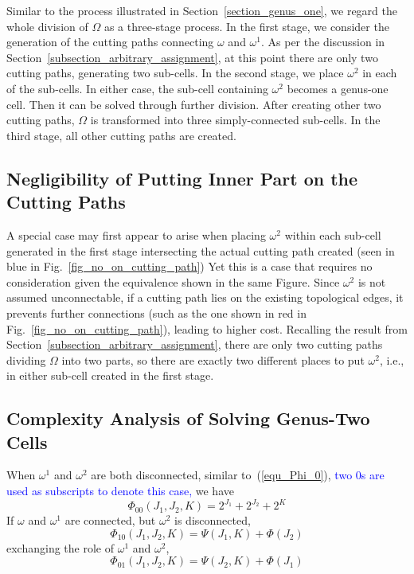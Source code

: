 \documentclass[Afour,sageh,times]{sagej}
\begin{document}
Similar to the process illustrated in Section~\ref{section_genus_one}, we regard the whole division of $\Omega$ as a three-stage process. 
In the first stage, we consider the generation of the cutting paths connecting $\omega$ and $\omega^1$. 
As per the discussion in Section~\ref{subsection_arbitrary_assignment}, at this point there are only two cutting paths, generating two sub-cells. 
In the second stage, we place $\omega^2$ in each of the sub-cells. 
In either case, the sub-cell containing $\omega^2$ becomes a genus-one cell. 
Then it can be solved through further division. 
After creating other two cutting paths, $\Omega$ is transformed into three simply-connected sub-cells. 
In the third stage, all other cutting paths are created. 

\subsection{Negligibility of Putting Inner Part on the Cutting Paths}
A special case may first appear to arise when placing $\omega^2$ within each sub-cell generated in the first stage intersecting 
the actual cutting path created (seen in blue in Fig.~\ref{fig_no_on_cutting_path}) 
Yet this is a case that requires no consideration given the equivalence shown in the same Figure. 
Since $\omega^2$ is not assumed unconnectable, if a cutting path lies on the existing topological edges, it prevents further connections
(such as the one shown in red in Fig.~\ref{fig_no_on_cutting_path}), leading to higher cost. 
Recalling the result from Section~\ref{subsection_arbitrary_assignment}, there are only two cutting paths dividing $\Omega$ into two parts, so there are exactly two different places to put $\omega^2$, i.e., in either sub-cell created in the first stage. 

\subsection{Complexity Analysis of Solving Genus-Two Cells}
\label{subsection_genus_two_complexity}
When $\omega^1$ and $\omega^2$ are both disconnected, similar to~(\ref{equ_Phi_0}), 
\textcolor{blue}{two $0$s are used as subscripts to denote this case, }
we have
\begin{equation}\label{equ_Phi_00}
\Phi_{00}(J_1, J_2, K) = 2^{J_1} +2^{J_2} + 2^K
\end{equation}
If $\omega$ and $\omega^1$ are connected, but $\omega^2$ is disconnected, 
\begin{equation}\label{equ_Phi_10}
\Phi_{10}(J_1, J_2, K) = \Psi(J_1, K)+\Phi(J_2)
\end{equation}
exchanging the role of $\omega^1$ and $\omega^2$, 
\begin{equation}\label{equ_Phi_01}
\Phi_{01}(J_1, J_2, K) = \Psi(J_2, K) + \Phi(J_1)
\end{equation}
\end{document}

